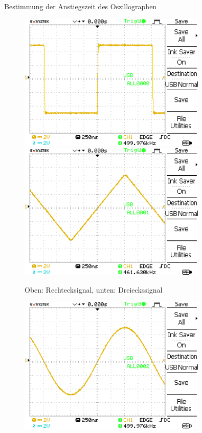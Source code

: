 \documentclass[ngerman]{scrartcl}
\theoremstyle{definition}
\begin{document}
\begin{aufgabe}{Bestimmung der Anstiegszeit des Oszillographen}
\begin{unteraufgabe}
				\begin{figure}[H]
					\centering
					\includegraphics[width=0.8\textwidth]{MesswerteVersuch0/A0000DS.png}
					\includegraphics[width=0.8\textwidth]{MesswerteVersuch0/A0001DS.png}
					\caption{Oben: Rechtecksignal, unten: Dreieckssignal}
					\label{fig:A0000DS,1}
				\end{figure}
				\begin{figure}[H]
					\centering
					\includegraphics[width=0.8\textwidth]{MesswerteVersuch0/A0002DS.png}

\end{figure}
\end{unteraufgabe}
\end{aufgabe}
\end{document}
